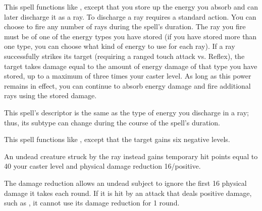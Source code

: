 \begin{spelleffect}
  This spell functions like , except that you store up the energy you absorb and can later discharge it as a ray. To discharge a ray requires a standard action. You can choose to fire any number of rays during the spell's duration. The ray you fire must be of one of the energy types you have stored (if you have stored more than one type, you can choose what kind of energy to use for each ray). If a ray successfully strikes its target (requiring a ranged touch attack vs. Reflex), the target takes damage equal to the amount of energy damage of that type you have stored, up to a maximum of three times your caster level. As long as this power remains in effect, you can continue to absorb energy damage and fire additional rays using the stored damage.
\end{spelleffect}
\begin{spellnotes}
  This spell's descriptor is the same as the type of energy you discharge in a ray; thus, its subtype can change during the course of the spell's duration.
\end{spellnotes}

\begin{spelleffect}
  This spell functions like , except that the target gains six negative levels.
  \par An undead creature struck by the ray instead gains temporary hit points equal to 40 \add your caster level and physical damage reduction 16/positive. 
\end{spelleffect}
\begin{spellnotes}
  The damage reduction allows an undead subject to ignore the first 16 physical damage it takes each round. If it is hit by an attack that deals positive damage, such as , it cannot use its damage reduction for 1 round.
\end{spellnotes}

